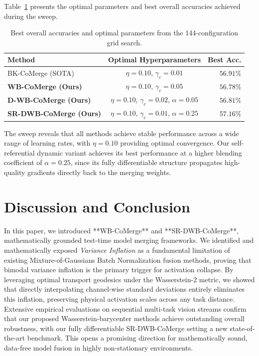 \documentclass{article}
\theoremstyle{plain}
\theoremstyle{definition}
\theoremstyle{remark}
\begin{document}
Table~\ref{tab:sweep} presents the optimal parameters and best overall accuracies achieved during the sweep.
\begin{table}[h]
  \caption{Best overall accuracies and optimal parameters from the 144-configuration grid search.}
  \label{tab:sweep}
  \vskip 0.1in
  \begin{center}
    \begin{scriptsize}
    \setlength{\tabcolsep}{1.0pt}
      \begin{tabular}{lcr}
        \toprule
        Method & Optimal Hyperparameters & Best Acc. \\
        \midrule
        BK-CoMerge (SOTA) & $\eta=0.10$, $\gamma_c=0.01$ & $56.91\%$ \\
        \textbf{WB-CoMerge (Ours)} & $\eta=0.10$, $\gamma_c=0.05$ & $56.78\%$ \\
        \textbf{D-WB-CoMerge (Ours)} & $\eta=0.10$, $\gamma_c=0.02$, $\alpha=0.05$ & $56.81\%$ \\
        \textbf{SR-DWB-CoMerge (Ours)} & $\eta=0.10$, $\gamma_c=0.01$, $\alpha=0.25$ & $\mathbf{57.16\%}$ \\
        \bottomrule
      \end{tabular}
    \end{scriptsize}
  \end{center}
  \vskip -0.1in
\end{table}

The sweep reveals that all methods achieve stable performance across a wide range of learning rates, with $\eta=0.10$ providing optimal convergence. Our self-referential dynamic variant achieves its best performance at a higher blending coefficient of $\alpha=0.25$, since its fully differentiable structure propagates high-quality gradients directly back to the merging weights.

\section{Discussion and Conclusion}
\label{sec:conclusion}

In this paper, we introduced **WB-CoMerge** and **SR-DWB-CoMerge**, mathematically grounded test-time model merging frameworks. We identified and mathematically exposed \emph{Variance Inflation} as a fundamental limitation of existing Mixture-of-Gaussians Batch Normalization fusion methods, proving that bimodal variance inflation is the primary trigger for activation collapse. By leveraging optimal transport geodesics under the Wasserstein-2 metric, we showed that directly interpolating channel-wise standard deviations entirely eliminates this inflation, preserving physical activation scales across any task distance. Extensive empirical evaluations on sequential multi-task vision streams confirm that our proposed Wasserstein-barycenter methods achieve outstanding overall robustness, with our fully differentiable SR-DWB-CoMerge setting a new state-of-the-art benchmark. This opens a promising direction for mathematically sound, data-free model fusion in highly non-stationary environments.
\end{document}
